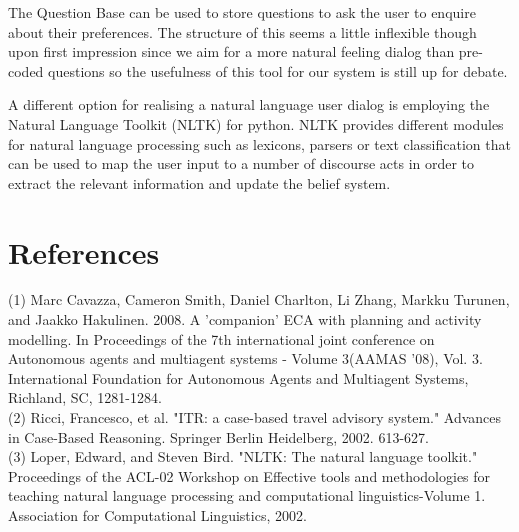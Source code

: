 \documentclass[11pt]{article} %
\begin{document}
The Question Base can be used to store questions to ask
the user to enquire about their preferences. The
structure of this seems a little inflexible though
upon first impression since we aim for a more natural
feeling dialog than pre-coded questions so the usefulness
of this tool for our system is still up for debate.

A different option for realising a natural language
user dialog is employing the Natural Language Toolkit
(NLTK) for python. NLTK provides different modules
for natural language processing such as lexicons,
parsers or text classification that can be used to
map the user input to a number of discourse acts in
order to extract the relevant information and update
the belief system.

\section{References}
(1) Marc Cavazza, Cameron Smith, Daniel Charlton, Li Zhang, Markku Turunen, and Jaakko Hakulinen. 2008. A 'companion' ECA with planning and activity modelling. In Proceedings of the 7th international joint conference on Autonomous agents and multiagent systems - Volume 3(AAMAS '08), Vol. 3. International Foundation for Autonomous Agents and Multiagent Systems, Richland, SC, 1281-1284.\\
(2) Ricci, Francesco, et al. "ITR: a case-based travel advisory system." Advances in Case-Based Reasoning. Springer Berlin Heidelberg, 2002. 613-627.\\
(3) Loper, Edward, and Steven Bird. "NLTK: The natural language toolkit." Proceedings of the ACL-02 Workshop on Effective tools and methodologies for teaching natural language processing and computational linguistics-Volume 1. Association for Computational Linguistics, 2002.
\end{document}
